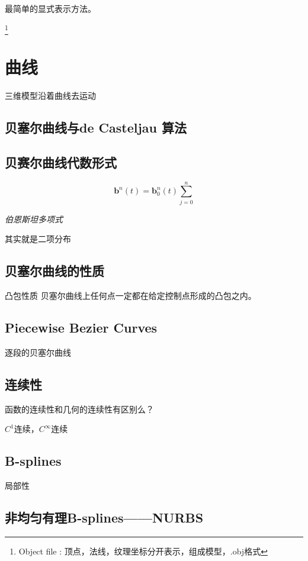 最简单的显式表示方法。

\footnote{Object file : 顶点，法线，纹理坐标分开表示，组成模型，.obj格式}

\section{曲线}

三维模型沿着曲线去运动

\subsection*{贝塞尔曲线与de Casteljau 算法}

\subsection*{贝赛尔曲线代数形式}

\begin{equation}
    \mathbf{b}^n(t)=\mathbf{b}^n_0(t)\sum\limits_{j=0}^{n}
\end{equation}

\textsl{伯恩斯坦多项式}

其实就是二项分布

\subsection*{贝塞尔曲线的性质}

凸包性质 贝塞尔曲线上任何点一定都在给定控制点形成的凸包之内。

\subsection*{Piecewise Bezier Curves}

逐段的贝塞尔曲线

\subsection*{连续性}

函数的连续性和几何的连续性有区别么？

$C^1$连续，$C^\infty$连续

\subsection*{B-splines}

局部性

\subsection*{非均匀有理B-splines——NURBS}

